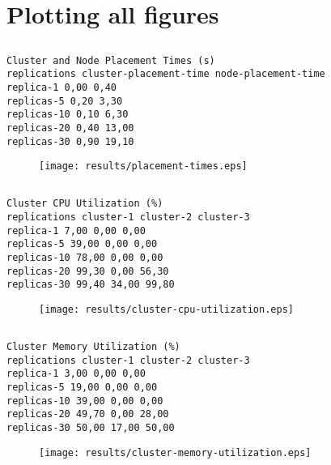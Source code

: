 \documentclass{elsart}
\begin{document}
\section{Plotting all figures}
\subsection{}

\begin{lstlisting}[caption={}]
Cluster and Node Placement Times (s)
replications cluster-placement-time node-placement-time
replica-1 0,00 0,40
replicas-5 0,20 3,30
replicas-10 0,10 6,30
replicas-20 0,40 13,00
replicas-30 0,90 19,10
\end{lstlisting}

\begin{figure}[ht]
\centering
\texttt{[image: results/placement-times.eps]}
\caption{}\label{fig:placement-times.eps}
\end{figure}

\subsection{}

\begin{lstlisting}[caption={}]
Cluster CPU Utilization (%)
replications cluster-1 cluster-2 cluster-3
replica-1 7,00 0,00 0,00
replicas-5 39,00 0,00 0,00
replicas-10 78,00 0,00 0,00
replicas-20 99,30 0,00 56,30
replicas-30 99,40 34,00 99,80
\end{lstlisting}

\begin{figure}[ht]
\centering
\texttt{[image: results/cluster-cpu-utilization.eps]}
\caption{}\label{fig:cluster-cpu-utilization.eps}
\end{figure}

\subsection{}

\begin{lstlisting}[caption={}]
Cluster Memory Utilization (%)
replications cluster-1 cluster-2 cluster-3
replica-1 3,00 0,00 0,00
replicas-5 19,00 0,00 0,00
replicas-10 39,00 0,00 0,00
replicas-20 49,70 0,00 28,00
replicas-30 50,00 17,00 50,00
\end{lstlisting}

\begin{figure}[ht]
\centering
\texttt{[image: results/cluster-memory-utilization.eps]}
\caption{}\label{fig:cluster-memory-utilization.eps}
\end{figure}
\end{document}
